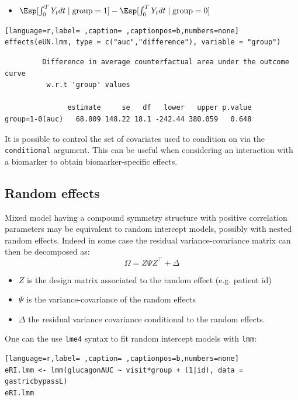 \documentclass[12pt]{article}
\newcommand\trans[1]{{#1}^\intercal}%
\begin{document}
\begin{itemize}
\item \(\Esp[\int_0^T Y_t dt \mid \text{group}=1]-\Esp[\int_0^T Y_t dt \mid \text{group}=0]\)
\end{itemize}
\begin{lstlisting}[language=r,label= ,caption= ,captionpos=b,numbers=none]
effects(eUN.lmm, type = c("auc","difference"), variable = "group")
\end{lstlisting}

\begin{verbatim}
	     Difference in average counterfactual area under the outcome curve
	      w.r.t 'group' values 

               estimate     se   df   lower   upper p.value  
group=1-0(auc)   68.809 148.22 18.1 -242.44 380.059   0.648
\end{verbatim}


It is possible to control the set of covariates used to condition on
via the \texttt{conditional} argument. This can be useful when considering an
interaction with a biomarker to obtain biomarker-specific effects.

\clearpage

\subsection{Random effects}
\label{sec:org60d2e13}

Mixed model having a compound symmetry structure with positive
correlation parameters may be equivalent to random intercept models,
possibly with nested random effects. Indeed in some case the residual
variance-covariance matrix can then be decomposed as:
\[ \Omega = Z \Psi \trans{Z} + \Delta \]
\begin{itemize}
\item \(Z\) is the design matrix associated to the random effect (e.g. patient id)
\item \(\Psi\) is the variance-covariance of the random effects
\item \(\Delta\) the residual variance covariance conditional to the random effects.
\end{itemize}
One can the use \texttt{lme4} syntax to fit random intercept models with
\texttt{lmm}:
\begin{lstlisting}[language=r,label= ,caption= ,captionpos=b,numbers=none]
eRI.lmm <- lmm(glucagonAUC ~ visit*group + (1|id), data = gastricbypassL)
eRI.lmm
\end{lstlisting}
\end{document}
